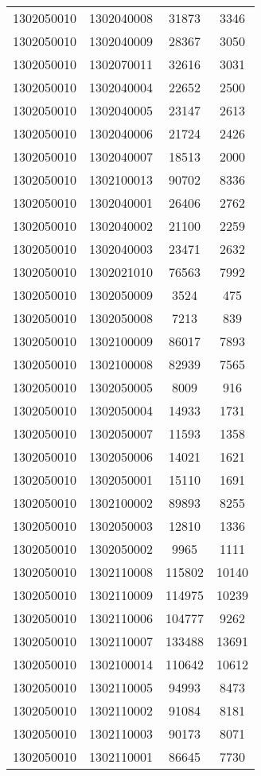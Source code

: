 \begin{longtable}{llcc}
1302050010 & 1302040008 & 31873 & 3346\\
1302050010 & 1302040009 & 28367 & 3050\\
1302050010 & 1302070011 & 32616 & 3031\\
1302050010 & 1302040004 & 22652 & 2500\\
1302050010 & 1302040005 & 23147 & 2613\\
1302050010 & 1302040006 & 21724 & 2426\\
1302050010 & 1302040007 & 18513 & 2000\\
1302050010 & 1302100013 & 90702 & 8336\\
1302050010 & 1302040001 & 26406 & 2762\\
1302050010 & 1302040002 & 21100 & 2259\\
1302050010 & 1302040003 & 23471 & 2632\\
1302050010 & 1302021010 & 76563 & 7992\\
1302050010 & 1302050009 & 3524 & 475\\
1302050010 & 1302050008 & 7213 & 839\\
1302050010 & 1302100009 & 86017 & 7893\\
1302050010 & 1302100008 & 82939 & 7565\\
1302050010 & 1302050005 & 8009 & 916\\
1302050010 & 1302050004 & 14933 & 1731\\
1302050010 & 1302050007 & 11593 & 1358\\
1302050010 & 1302050006 & 14021 & 1621\\
1302050010 & 1302050001 & 15110 & 1691\\
1302050010 & 1302100002 & 89893 & 8255\\
1302050010 & 1302050003 & 12810 & 1336\\
1302050010 & 1302050002 & 9965 & 1111\\
1302050010 & 1302110008 & 115802 & 10140\\
1302050010 & 1302110009 & 114975 & 10239\\
1302050010 & 1302110006 & 104777 & 9262\\
1302050010 & 1302110007 & 133488 & 13691\\
1302050010 & 1302100014 & 110642 & 10612\\
1302050010 & 1302110005 & 94993 & 8473\\
1302050010 & 1302110002 & 91084 & 8181\\
1302050010 & 1302110003 & 90173 & 8071\\
1302050010 & 1302110001 & 86645 & 7730\\

\end{longtable}
